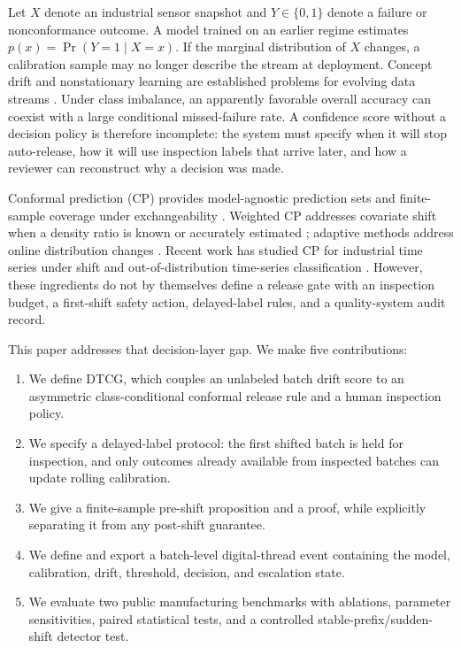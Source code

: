 \documentclass[journal]{IEEEtran}
\begin{document}
Let $X$ denote an industrial sensor snapshot and $Y\in\{0,1\}$ denote a failure or nonconformance outcome. A model trained on an earlier regime estimates $p(x)=\Pr(Y=1\mid X=x)$. If the marginal distribution of $X$ changes, a calibration sample may no longer describe the stream at deployment. Concept drift and nonstationary learning are established problems for evolving data streams \cite{gama2014,lu2019,ditzler2015}. Under class imbalance, an apparently favorable overall accuracy can coexist with a large conditional missed-failure rate. A confidence score without a decision policy is therefore incomplete: the system must specify when it will stop auto-release, how it will use inspection labels that arrive later, and how a reviewer can reconstruct why a decision was made.

Conformal prediction (CP) provides model-agnostic prediction sets and finite-sample coverage under exchangeability \cite{vovk2005,shafer2008,angelopoulos2023}. Weighted CP addresses covariate shift when a density ratio is known or accurately estimated \cite{tibshirani2019}; adaptive methods address online distribution changes \cite{gibbs2021}. Recent work has studied CP for industrial time series under shift \cite{zhang2025} and out-of-distribution time-series classification \cite{nanopoulos2025}. However, these ingredients do not by themselves define a release gate with an inspection budget, a first-shift safety action, delayed-label rules, and a quality-system audit record.

This paper addresses that decision-layer gap. We make five contributions:
\begin{enumerate}
    \item We define DTCG, which couples an unlabeled batch drift score to an asymmetric class-conditional conformal release rule and a human inspection policy.
    \item We specify a delayed-label protocol: the first shifted batch is held for inspection, and only outcomes already available from inspected batches can update rolling calibration.
    \item We give a finite-sample pre-shift proposition and a proof, while explicitly separating it from any post-shift guarantee.
    \item We define and export a batch-level digital-thread event containing the model, calibration, drift, threshold, decision, and escalation state.
    \item We evaluate two public manufacturing benchmarks with ablations, parameter sensitivities, paired statistical tests, and a controlled stable-prefix/sudden-shift detector test.
\end{enumerate}
\end{document}
